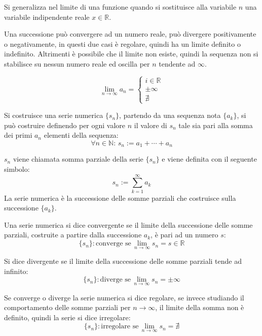 \documentclass{article}
\numberwithin{equation}{subsection}
\begin{document}
Si generalizza nel limite di una funzione quando si sostituisce alla variabile $n$ una variabile indipendente reale $x\in\mathbb{R}$. 

Una successione può convergere ad un numero reale, può divergere positivamente o negativamente, in questi due casi è regolare, quindi ha un limite definito o indefinito. Altrimenti è possibile che il limite non esiste, quindi la sequenza non si stabilisce su nessun numero reale ed oscilla per $n$ tendente ad $\infty$. 

\begin{equation}
    \lim_{n\to\infty}a_n=\begin{cases}
        i\in\mathbb{R}\\
        \pm\infty\\
        \nexists
    \end{cases}
\end{equation}

Si costruisce una serie numerica $\{s_n\}$, partendo da una sequenza nota $\{a_k\}$, si può costruire definendo per ogni valore $n$ il valore di $s_n$ tale sia pari alla somma dei primi $a_n$ elementi della sequenza:
\begin{equation}
    \forall n\in\mathbb{N}:\,
    s_n:=a_1+\cdots+a_n
\end{equation}

$s_n$ viene chiamata somma parziale della serie $\{s_n\}$ e viene definita con il seguente simbolo:
\begin{equation}
    s_n:=\displaystyle\sum_{k=1}^\infty a_k
\end{equation}
La serie numerica è la successione delle somme parziali che costruisce sulla successione $\{a_k\}$. 

Una serie numerica si dice convergente se il limite della successione delle somme parziali, costruite a partire dalla successione $a_k$, è pari ad un numero $s$:
\begin{equation}
    \{s_n\}: \mbox{converge se}\,\lim_{n\to\infty}s_n=s\in\mathbb{R}
\end{equation}

Si dice divergente se il limite della successione delle somme parziali tende ad infinito:
\begin{equation}
    \{s_n\}: \mbox{diverge se}\,\lim_{n\to\infty}s_n=\pm\infty
\end{equation}

Se converge o diverge la serie numerica si dice regolare, se invece studiando il comportamento delle somme parziali per $n\to\infty$, il limite della somma non è definito, quindi la serie si dice irregolare:
\begin{equation}
    \{s_n\}: \mbox{irregolare se}\,\lim_{n\to\infty}s_n=\nexists
\end{equation}
\end{document}
